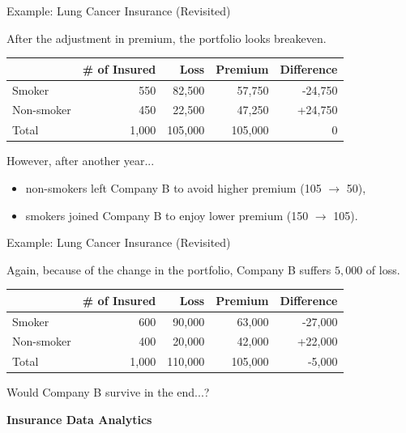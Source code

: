 \documentclass[ignorenonframetext,]{beamer}
\begin{document}
\begin{frame}{Example: Lung Cancer Insurance (Revisited)}

After the adjustment in premium, the portfolio looks breakeven.
\begin{table}[]
\begin{tabular}{l|rrrr}
\hline\hline
           & \# of Insured & Loss    & Premium & Difference \\ \hline
Smoker     & 550           & 82,500  & 57,750  & -24,750          \\
Non-smoker & 450           & 22,500  & 47,250  & +24,750          \\ \hline
Total      & 1,000         & 105,000 & 105,000 & 0       \\  \hline\hline
\end{tabular}
\end{table}

 However, after another year...
\begin{itemize}
	 \item {} non-smokers left Company B to avoid higher premium (105 $\rightarrow$ 50),
 	 \item {} smokers joined Company B to enjoy lower premium (150 $\rightarrow$ 105).
\end{itemize}
\end{frame}


\begin{frame}{Example: Lung Cancer Insurance (Revisited)}

Again, because of the change in the portfolio, Company B suffers $5,000$ of loss.
\begin{table}[]
\begin{tabular}{l|rrrr}
\hline\hline
           & \# of Insured & Loss    & Premium & Difference \\ \hline
Smoker     & 600           & 90,000  & 63,000  & -27,000          \\
Non-smoker & 400           & 20,000  & 42,000  & +22,000          \\ \hline
Total      & 1,000         & 110,000 & 105,000 & -5,000       \\  \hline\hline
\end{tabular}
\end{table}

 \color{red} Would Company B survive in the end...?
\end{frame}


\begin{frame}{}

\begin{center}
\Huge \textbf{Insurance Data Analytics}
\end{center}

\end{frame}
\end{document}
